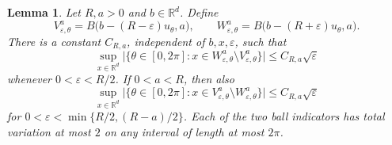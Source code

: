 \documentclass[12pt,reqno,tbtags]{amsart}
\newtheorem{lemma}{Lemma}[section]
\def\R{\mathbb{R}}
\newcommand\1{\mathbbm{1}}
\newcommand{\eps}{\varepsilon}
\begin{document}
\begin{lemma}\label{lem:geom-moving-balls}
Let $R,a>0$ and $b\in\R^d$. Define
\begin{equation}\label{eq:geom-component-windows}
    V_{\eps,\theta}^{a}=B\bigl(b-(R-\eps)u_\theta,a\bigr),
    \qquad
    W_{\eps,\theta}^{a}=B\bigl(b-(R+\eps)u_\theta,a\bigr).
\end{equation}
There is a constant $C_{R,a}$, independent of $b,x,\eps$, such that
\begin{equation}\label{eq:geom-outer-loss}
    \sup_{x\in\R^d}
    \bigl|\{\theta\in[0,2\pi]:
        x\in W_{\eps,\theta}^{a}\setminus V_{\eps,\theta}^{a}\}\bigr|
    \le C_{R,a}\sqrt{\eps}
\end{equation}
whenever $0<\eps<R/2$. If $0<a<R$, then also
\begin{equation}\label{eq:geom-inner-loss}
    \sup_{x\in\R^d}
    \bigl|\{\theta\in[0,2\pi]:
        x\in V_{\eps,\theta}^{a}\setminus W_{\eps,\theta}^{a}\}\bigr|
    \le C_{R,a}\sqrt{\eps}
\end{equation}
for $0<\eps<\min\{R/2,(R-a)/2\}$. Each of the two ball indicators has total
variation at most $2$ on any interval of length at most $2\pi$.
\end{lemma}
\end{document}
